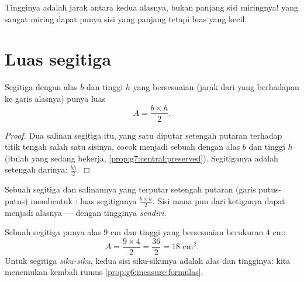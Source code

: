 \begin{remark}
Tingginya adalah jarak \emph{} antara kedua alasnya, bukan
panjang sisi miringnya!  yang sangat miring dapat punya
sisi yang panjang tetapi luas yang kecil.
\end{remark}

\section{Luas segitiga}

\begin{theorem}[Segitiga]\label{thm:g7:areas:triangle}
Segitiga dengan alas $b$ dan tinggi $h$ yang bersesuaian (jarak  dari  yang berhadapan ke garis alasnya) punya
luas
\[
A = \frac{b \times h}{2} .
\]
\end{theorem}

\begin{proof}
Dua salinan segitiga itu, yang satu diputar setengah putaran terhadap
titik tengah salah satu sisinya, cocok menjadi sebuah 
dengan alas $b$ dan tinggi $h$ (itulah  yang sedang
bekerja, \cref{prop:g7:central:preserved}). Segitiganya adalah
setengah darinya: $\frac{bh}{2}$.
\end{proof}

\begin{omfigure}

{\small Sebuah segitiga dan salinannya yang terputar setengah putaran
(garis putus-putus) membentuk : luas segitiganya
$\frac{b\times h}{2}$. Sisi mana pun dari ketiganya dapat menjadi
alasnya --- dengan tingginya \emph{sendiri}.}
\end{omfigure}

\begin{example}\label{ex:g7:areas:triangle}
Sebuah segitiga punya alas $9$ cm dan tinggi yang bersesuaian
berukuran $4$ cm:
\[
A = \frac{9 \times 4}{2} = \frac{36}{2} = 18 \text{ cm}^2 .
\]
Untuk segitiga \emph{siku-siku}, kedua sisi siku-sikunya adalah alas
dan tingginya: kita menemukan kembali rumus
\cref{prop:g6:measure:formulas}.
\end{example}

